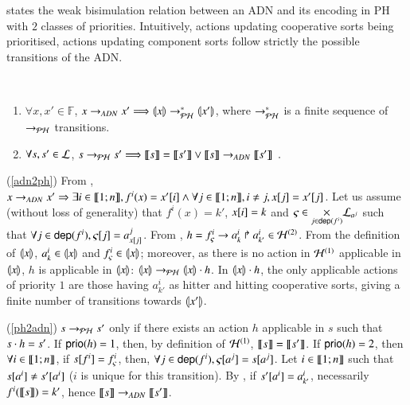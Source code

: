  states the weak bisimulation relation between an ADN and its encoding in
PH with $2$ classes of priorities.
Intuitively, actions updating cooperative sorts being prioritised, actions updating component
sorts follow strictly the possible transitions of the ADN.

\begin{theorem}[$\DNdef \approx \toPH\DNdef$]~
\label{th:bisimDN}
  \begin{enumerate}
    \item \label{adn2ph} $\forall x,x'\in\mathbb F$,
      $x\rightarrow_{ADN} x' \Longrightarrow \llparenthesis x\rrparenthesis \rightarrow_{\mathcal{PH}}^* \llparenthesis x'\rrparenthesis$,
      where $\rightarrow_{\mathcal{PH}}^*$ is a finite sequence of $\rightarrow_{\mathcal{PH}}$ transitions.

    \item \label{ph2adn} $\forall s,s'\in \mathcal{L}$,
      $s\rightarrow_{\mathcal{PH}} s' \Longrightarrow \llbracket s\rrbracket = \llbracket s'\rrbracket \vee \llbracket s\rrbracket \rightarrow_{ADN}
      \llbracket s'\rrbracket\enspace.$
  \end{enumerate}
\end{theorem}
%
\begin{proofbisimDN}
(\ref{adn2ph}) From , $x\rightarrow_{ADN} x'\Rightarrow \exists i\in\llbracket 1; n \rrbracket,
f^i(x)=x'[{i}] \wedge \forall j\in\llbracket 1; n \rrbracket,i\neq j, x[{j}]=x'[{j}]$.
Let us assume (without loss of generality) that $f^i(x)=k'$, $x[{i}]=k$ and
$\varsigma\in\underset{j\in\mathsf{dep}(f^i)}{\times} \mathcal{L}_{a^j}$ such that
$\forall j\in\mathsf{dep}(f^i), \varsigma[{j}]=a^j_{x[{j}]}$.
From , $h=f^i_\varsigma\rightarrow a^i_k\Rsh a^i_{k'}\in\mathcal{H}^{(2)}$.
From the definition of $\llparenthesis x\rrparenthesis$,
$a^i_k\in \llparenthesis x\rrparenthesis$ and $f^i_\varsigma\in \llparenthesis x\rrparenthesis$;
moreover, as there is no action in $\mathcal{H}^{(1)}$ applicable in $\llparenthesis x\rrparenthesis$,
$h$ is applicable in $\llparenthesis x\rrparenthesis$:
$\llparenthesis x\rrparenthesis\rightarrow_{\mathcal{PH}} \llparenthesis x\rrparenthesis\cdot h$.
In $\llparenthesis x\rrparenthesis\cdot h$, the only applicable actions of priority $1$ are those having
$a^i_{k'}$ as hitter and hitting cooperative sorts, giving a finite number of transitions towards
$\llparenthesis x'\rrparenthesis$.

(\ref{ph2adn}) $s\rightarrow_{\mathcal{PH}} s'$ only if there exists an action $h$ applicable in $s$ such that
$s\cdot h=s'$.
If $\mathsf{prio}(h)=1$, then, by definition of $\mathcal{H}^{(1)}$, 
$\llbracket s\rrbracket=\llbracket s'\rrbracket$.
If $\mathsf{prio}(h)=2$, then $\forall i\in\llbracket 1; n \rrbracket$,
if $s[{f^i}] = f^i_\varsigma$, then, $\forall j\in\mathsf{dep}(f^i),
\varsigma[{a^j}]=s[{a^j}]$.
Let $i\in\llbracket 1; n \rrbracket$ such that $s[{a^i}]\neq s'[{a^i}]$ ($i$ is unique for this
transition).
By , if $s'[{a^i}]=a^i_{k'}$, necessarily $f^i(\llbracket s\rrbracket)=k'$, hence
$\llbracket s\rrbracket\rightarrow_{ADN} \llbracket s'\rrbracket$.
\end{proofbisimDN}

